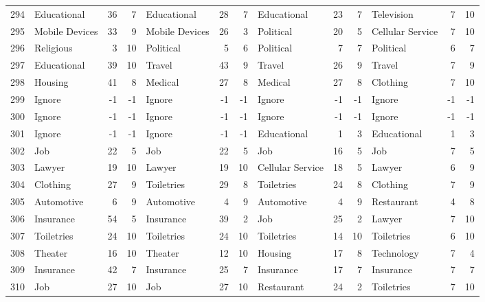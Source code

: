 \begin{figure}[htbp]
\begin{tabular}{rlrrlrrlrrlrr}
    294   & Educational & 36    & 7     & Educational & 28    & 7     & Educational & 23    & 7     & Television & 7     & 10 \\
    295   & Mobile Devices & 33    & 9     & Mobile Devices & 26    & 3     & Political & 20    & 5     & Cellular Service & 7     & 10 \\
    296   & Religious & 3     & 10    & Political & 5     & 6     & Political & 7     & 7     & Political & 6     & 7 \\
    297   & Educational & 39    & 10    & Travel & 43    & 9     & Travel & 26    & 9     & Travel & 7     & 9 \\
    298   & Housing & 41    & 8     & Medical & 27    & 8     & Medical & 27    & 8     & Clothing & 7     & 10 \\
    299   & Ignore & -1    & -1    & Ignore & -1    & -1    & Ignore & -1    & -1    & Ignore & -1    & -1 \\
    300   & Ignore & -1    & -1    & Ignore & -1    & -1    & Ignore & -1    & -1    & Ignore & -1    & -1 \\
    301   & Ignore & -1    & -1    & Ignore & -1    & -1    & Educational & 1     & 3     & Educational & 1     & 3 \\
    302   & Job   & 22    & 5     & Job   & 22    & 5     & Job   & 16    & 5     & Job   & 7     & 5 \\
    303   & Lawyer & 19    & 10    & Lawyer & 19    & 10    & Cellular Service & 18    & 5     & Lawyer & 6     & 9 \\
    304   & Clothing & 27    & 9     & Toiletries & 29    & 8     & Toiletries & 24    & 8     & Clothing & 7     & 9 \\
    305   & Automotive & 6     & 9     & Automotive & 4     & 9     & Automotive & 4     & 9     & Restaurant & 4     & 8 \\
    306   & Insurance & 54    & 5     & Insurance & 39    & 2     & Job   & 25    & 2     & Lawyer & 7     & 10 \\
    307   & Toiletries & 24    & 10    & Toiletries & 24    & 10    & Toiletries & 14    & 10    & Toiletries & 6     & 10 \\
    308   & Theater & 16    & 10    & Theater & 12    & 10    & Housing & 17    & 8     & Technology & 7     & 4 \\
    309   & Insurance & 42    & 7     & Insurance & 25    & 7     & Insurance & 17    & 7     & Insurance & 7     & 7 \\
    310   & Job   & 27    & 10    & Job   & 27    & 10    & Restaurant & 24    & 2     & Toiletries & 7     & 10 \\

\end{tabular}
\end{figure}
